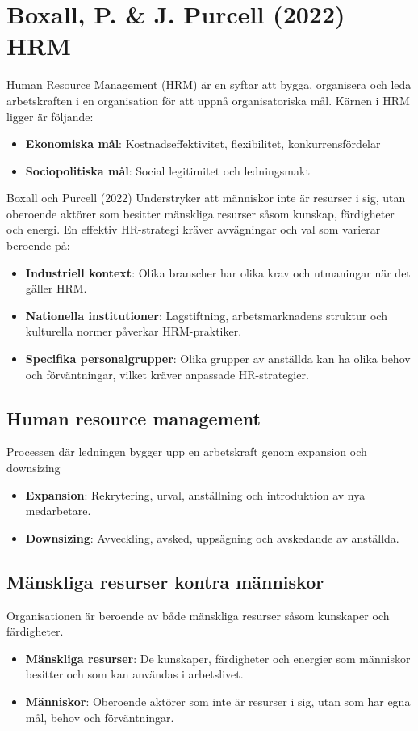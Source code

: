 \documentclass[12pt,a4paper]{article}
\begin{document}
\section{Boxall, P. \& J. Purcell (2022) HRM}
Human Resource Management (HRM) är en syftar att bygga, organisera och leda
arbetskraften i en organisation för att uppnå organisatoriska mål. Kärnen i HRM ligger är följande:
\begin{itemize}
    \item \textbf{Ekonomiska mål}: Kostnadseffektivitet, flexibilitet, konkurrensfördelar
    \item \textbf{Sociopolitiska mål}: Social legitimitet och ledningsmakt
\end{itemize}
Boxall och Purcell (2022) Understryker att människor inte är resurser
i sig, utan oberoende aktörer som besitter mänskliga resurser såsom kunskap, färdigheter och energi.
En effektiv HR-strategi kräver avvägningar och val som varierar beroende på:
\begin{itemize}
    \item \textbf{Industriell kontext}: Olika branscher har olika krav och utmaningar när det gäller HRM.
    \item \textbf{Nationella institutioner}: Lagstiftning, arbetsmarknadens struktur och kulturella normer påverkar HRM-praktiker.
    \item \textbf{Specifika personalgrupper}: Olika grupper av anställda kan ha olika behov och förväntningar, vilket kräver anpassade HR-strategier.
\end{itemize}

\subsection{Human resource management}
Processen där ledningen bygger upp en arbetskraft genom expansion och downsizing
\begin{itemize}
    \item \textbf{Expansion}: Rekrytering, urval, anställning och introduktion av nya medarbetare.
    \item \textbf{Downsizing}: Avveckling, avsked, uppsägning och avskedande av anställda.
\end{itemize}

\subsection{Mänskliga resurser kontra människor}
Organisationen är beroende av både mänskliga resurser såsom kunskaper och färdigheter.
\begin{itemize}
    \item \textbf{Mänskliga resurser}: De kunskaper, färdigheter och energier som människor besitter och som kan användas i arbetslivet.
    \item \textbf{Människor}: Oberoende aktörer som inte är resurser i sig, utan som har egna mål, behov och förväntningar.
\end{itemize}
\end{document}

